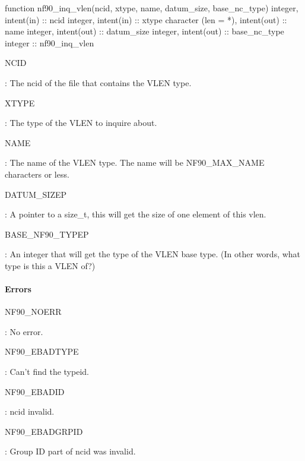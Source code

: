 \begin{DoxyCode}
\textcolor{keyword}{function }nf90\_inq\_vlen(ncid, xtype, name, datum\_size, base\_nc\_type)
  \textcolor{keywordtype}{integer}, \textcolor{keywordtype}{intent(in)} :: ncid
  \textcolor{keywordtype}{integer}, \textcolor{keywordtype}{intent(in)} :: xtype
  \textcolor{keywordtype}{character (len = *)}, \textcolor{keywordtype}{intent(out)} :: name
  \textcolor{keywordtype}{integer}, \textcolor{keywordtype}{intent(out)} :: datum\_size
  \textcolor{keywordtype}{integer}, \textcolor{keywordtype}{intent(out)} :: base\_nc\_type
  \textcolor{keywordtype}{integer} :: nf90\_inq\_vlen
\end{DoxyCode}


{\ttfamily N\+C\+ID}

\+: The ncid of the file that contains the V\+L\+EN type.

{\ttfamily X\+T\+Y\+PE}

\+: The type of the V\+L\+EN to inquire about.

{\ttfamily N\+A\+ME}

\+: The name of the V\+L\+EN type. The name will be N\+F90\+\_\+\+M\+A\+X\+\_\+\+N\+A\+ME characters or less.

{\ttfamily D\+A\+T\+U\+M\+\_\+\+S\+I\+Z\+EP}

\+: A pointer to a size\+\_\+t, this will get the size of one element of this vlen.

{\ttfamily B\+A\+S\+E\+\_\+\+N\+F90\+\_\+\+T\+Y\+P\+EP}

\+: An integer that will get the type of the V\+L\+EN base type. (In other words, what type is this a V\+L\+EN of?)

\paragraph*{Errors}

{\ttfamily N\+F90\+\_\+\+N\+O\+E\+RR}

\+: No error.

{\ttfamily N\+F90\+\_\+\+E\+B\+A\+D\+T\+Y\+PE}

\+: Can’t find the typeid.

{\ttfamily N\+F90\+\_\+\+E\+B\+A\+D\+ID}

\+: ncid invalid.

{\ttfamily N\+F90\+\_\+\+E\+B\+A\+D\+G\+R\+P\+ID}

\+: Group ID part of ncid was invalid.

